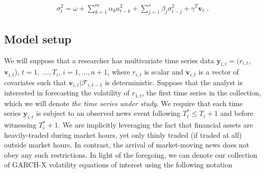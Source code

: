 \documentclass{uiucthesis2021}
\newcommand{\y}{\textbf{y}}
\newcommand{\x}{\textbf{v}}
\theoremstyle{definition}
\begin{document}
\begin{align}
\sigma_{t}^{2} = \omega+ \sum^{m}_{k=1}\alpha_{k}a^{2}_{t-k} + \sum_{j=1}^{s}\beta_{j}\sigma_{t-j}^{2} + \gamma^{T}\x_{t} \text{ .}\label{GARCH-X}
\end{align}

\subsection{Model setup}
\label{modelsetup}
We will suppose that a researcher has multivariate time series data $\y_{i,t} = (r_{i,t}$, $\x_{i,t}$), $t = 1,$ $\ldots,  T_i$, $i = 1, \ldots, n+1$, where $r_{i,t}$ is scalar and $\x_{i,t}$ is a vector of covariates such that $\x_{i,t}|\mathcal{F}_{i,t-1}$ is deterministic.  Suppose that the analyst is interested in forecasting the volatility of $r_{1,t}$, the first time series in the collection, which we will denote \textit{the time series under study}.  We require that each time series $\y_{i,t}$ is subject to an observed news event following $T^*_i \leq T_{i} + 1$ and before witnessing $T^*_i+1$.  We are implicitly leveraging the fact that financial assets are heavily-traded during market hours, yet only thinly traded (if traded at all) outside market hours.  In contrast, the arrival of market-moving news does not obey any such restrictions.  In light of the foregoing, we can denote our collection of GARCH-X volatility equations of interest using the following notation
\end{document}
